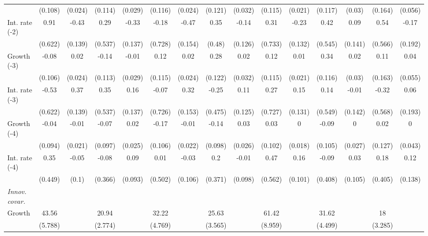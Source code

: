 \begin{table}[htbp]
\begin{tabular}{@{\extracolsep{4pt}}lcccccccccccccc@{}}
 		 & (0.108) 	 & (0.024) 	 & (0.114) 	 & (0.029) 	 & (0.116) 	 & (0.024) 	 & (0.121) 	 & (0.032) 	 & (0.115) 	 & (0.021) 	 & (0.117) 	 & (0.03) 	 & (0.164) 	 & (0.056) 	 \\ 
\quad Int. rate (-2) 	 &0.91 	 & -0.43 	 & 0.29 	 & -0.33 	 & -0.18 	 & -0.47 	 & 0.35 	 & -0.14 	 & 0.31 	 & -0.23 	 & 0.42 	 & 0.09 	 & 0.54 	 & -0.17	 \\ 
 		 & (0.622) 	 & (0.139) 	 & (0.537) 	 & (0.137) 	 & (0.728) 	 & (0.154) 	 & (0.48) 	 & (0.126) 	 & (0.733) 	 & (0.132) 	 & (0.545) 	 & (0.141) 	 & (0.566) 	 & (0.192) 	 \\ 
\quad Growth (-3) 	 &-0.08 	 & 0.02 	 & -0.14 	 & -0.01 	 & 0.12 	 & 0.02 	 & 0.28 	 & 0.02 	 & 0.12 	 & 0.01 	 & 0.34 	 & 0.02 	 & 0.11 	 & 0.04	 \\ 
 		 & (0.106) 	 & (0.024) 	 & (0.113) 	 & (0.029) 	 & (0.115) 	 & (0.024) 	 & (0.122) 	 & (0.032) 	 & (0.115) 	 & (0.021) 	 & (0.116) 	 & (0.03) 	 & (0.163) 	 & (0.055) 	 \\ 
\quad Int. rate (-3) 	 &-0.53 	 & 0.37 	 & 0.35 	 & 0.16 	 & -0.07 	 & 0.32 	 & -0.25 	 & 0.11 	 & 0.27 	 & 0.15 	 & 0.14 	 & -0.01 	 & -0.32 	 & 0.06	 \\ 
 		 & (0.622) 	 & (0.139) 	 & (0.537) 	 & (0.137) 	 & (0.726) 	 & (0.153) 	 & (0.475) 	 & (0.125) 	 & (0.727) 	 & (0.131) 	 & (0.549) 	 & (0.142) 	 & (0.568) 	 & (0.193) 	 \\ 
\quad Growth (-4) 	 &-0.04 	 & -0.01 	 & -0.07 	 & 0.02 	 & -0.17 	 & -0.01 	 & -0.14 	 & 0.03 	 & 0.03 	 & 0 	 & -0.09 	 & 0 	 & 0.02 	 & 0	 \\ 
 		 & (0.094) 	 & (0.021) 	 & (0.097) 	 & (0.025) 	 & (0.106) 	 & (0.022) 	 & (0.098) 	 & (0.026) 	 & (0.102) 	 & (0.018) 	 & (0.105) 	 & (0.027) 	 & (0.127) 	 & (0.043) 	 \\ 
\quad Int. rate (-4) 	 &0.35 	 & -0.05 	 & -0.08 	 & 0.09 	 & 0.01 	 & -0.03 	 & 0.2 	 & -0.01 	 & 0.47 	 & 0.16 	 & -0.09 	 & 0.03 	 & 0.18 	 & 0.12	 \\ 
 		 & (0.449) 	 & (0.1) 	 & (0.366) 	 & (0.093) 	 & (0.502) 	 & (0.106) 	 & (0.371) 	 & (0.098) 	 & (0.562) 	 & (0.101) 	 & (0.408) 	 & (0.105) 	 & (0.405) 	 & (0.138) 	 \\ 
\rule{0pt}{4ex} \emph{Innov. covar.}  	 & 	 & 	 & 	 & 	 & 	 & 	 & 	 & 	 & 	 & 	 & 	 & 	 & 	 &\\ 
\quad Growth 	 &43.56 	 &  	 & 20.94 	 &  	 & 32.22 	 &  	 & 25.63 	 &  	 & 61.42 	 &  	 & 31.62 	 &  	 & 18 	 & 	 \\ 
 		 & (5.788) 	 &  	 & (2.774) 	 &  	 & (4.769) 	 &  	 & (3.565) 	 &  	 & (8.959) 	 &  	 & (4.499) 	 &  	 & (3.285) 	 &  	 \\ 

\end{tabular}
\end{table}

